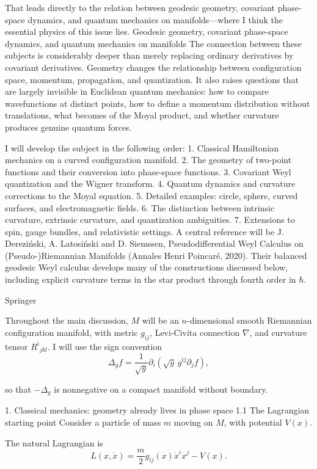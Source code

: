That leads directly to the relation between geodesic geometry, covariant phase-space dynamics, and quantum mechanics on manifolds—where I think the essential physics of this issue lies.
Geodesic geometry, covariant phase-space dynamics, and quantum mechanics on manifolds
The connection between these subjects is considerably deeper than merely replacing ordinary derivatives by covariant derivatives. Geometry changes the relationship between configuration space, momentum, propagation, and quantization. It also raises questions that are largely invisible in Euclidean quantum mechanics: how to compare wavefunctions at distinct points, how to define a momentum distribution without translations, what becomes of the Moyal product, and whether curvature produces genuine quantum forces.

I will develop the subject in the following order:
1. Classical Hamiltonian mechanics on a curved configuration manifold.
2. The geometry of two-point functions and their conversion into phase-space functions.
3. Covariant Weyl quantization and the Wigner transform.
4. Quantum dynamics and curvature corrections to the Moyal equation.
5. Detailed examples: circle, sphere, curved surfaces, and electromagnetic fields.
6. The distinction between intrinsic curvature, extrinsic curvature, and quantization ambiguities.
7. Extensions to spin, gauge bundles, and relativistic settings.
A central reference will be J. Dereziński, A. Latosiński and D. Siemssen, Pseudodifferential Weyl Calculus on (Pseudo-)Riemannian Manifolds (Annales Henri Poincaré, 2020). Their balanced geodesic Weyl calculus develops many of the constructions discussed below, including explicit curvature terms in the star product through fourth order in \(\hbar\). 

Springer




Throughout the main discussion, \(M\) will be an \(n\)-dimensional smooth Riemannian configuration manifold, with metric \(g_{ij}\), Levi-Civita connection \(\nabla\), and curvature tensor \(R^i{}_{jkl}\). I will use the sign convention
\[
\Delta_g f=
\frac{1}{\sqrt g}\partial_i
\left(\sqrt g\,g^{ij}\partial_j f\right),
\]

so that \(-\Delta_g\) is nonnegative on a compact manifold without boundary.

1. Classical mechanics: geometry already lives in phase space
1.1 The Lagrangian starting point
Consider a particle of mass \(m\) moving on \(M\), with potential \(V(x)\).

The natural Lagrangian is
\[
L(x,\dot x)=
\frac m2g_{ij}(x)\dot x^i\dot x^j-V(x).
\tag{1}
\]

